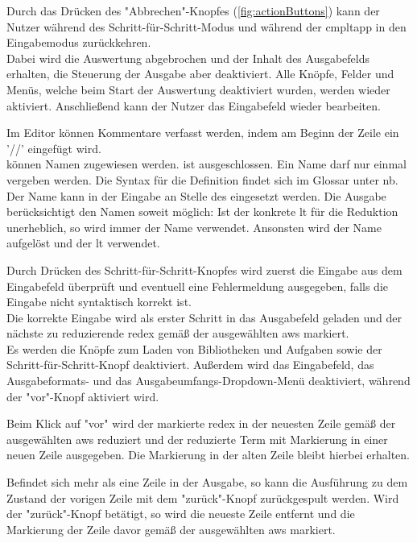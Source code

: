 \documentclass[parskip=full,11pt,twoside]{scrartcl}
\begin{document}
Durch das Drücken des "Abbrechen"-Knopfes (\cref{fig:actionButtons}) kann der Nutzer während des Schritt-für-Schritt-Modus und während der \gls{cmpltapp} in den Eingabemodus zurückkehren.\\
Dabei wird die Auswertung abgebrochen und der Inhalt des Ausgabefelds erhalten, die Steuerung der Ausgabe aber deaktiviert.
Alle Knöpfe, Felder und Menüs, welche beim Start der Auswertung deaktiviert wurden, werden wieder aktiviert.
Anschließend kann der Nutzer das Eingabefeld wieder bearbeiten.

Im Editor können Kommentare verfasst werden, 
indem am Beginn der Zeile ein '//' eingefügt wird.\\
 können Namen zugewiesen werden.
 ist ausgeschlossen. Ein Name darf nur einmal vergeben werden.
Die Syntax für die Definition findet sich im Glossar unter \gls{nb}.
Der Name kann in der Eingabe an Stelle des  eingesetzt werden.
Die Ausgabe berücksichtigt den Namen soweit möglich:
Ist der konkrete \gls{lt} für die Reduktion unerheblich, so wird immer der Name verwendet.
Ansonsten wird der Name aufgelöst und der \gls{lt} verwendet.

Durch Drücken des Schritt-für-Schritt-Knopfes wird zuerst die Eingabe aus dem Eingabefeld überprüft und eventuell eine Fehlermeldung ausgegeben, falls die Eingabe nicht syntaktisch korrekt ist. \\
Die korrekte Eingabe wird als erster Schritt in das Ausgabefeld geladen und der nächste zu reduzierende \gls{redex} gemäß der ausgewählten \gls{aws} markiert. \\
Es werden die Knöpfe zum Laden von Bibliotheken und Aufgaben sowie der Schritt-für-Schritt-Knopf deaktiviert.
Außerdem wird das Eingabefeld, das Ausgabeformats- und das Ausgabeumfangs-Dropdown-Menü deaktiviert, während der "vor"-Knopf aktiviert wird.

Beim Klick auf "vor" wird der markierte \gls{redex} in der neuesten Zeile gemäß der ausgewählten \gls{aws} reduziert und der reduzierte Term mit Markierung in einer neuen Zeile ausgegeben.
Die Markierung in der alten Zeile bleibt hierbei erhalten.

Befindet sich mehr als eine Zeile in der Ausgabe, so kann die Ausführung zu dem Zustand der vorigen Zeile mit dem "zurück"-Knopf zurückgespult werden.
Wird der "zurück"-Knopf betätigt, so wird die neueste Zeile entfernt und die Markierung der Zeile davor gemäß der ausgewählten \gls{aws} markiert.
\end{document}
